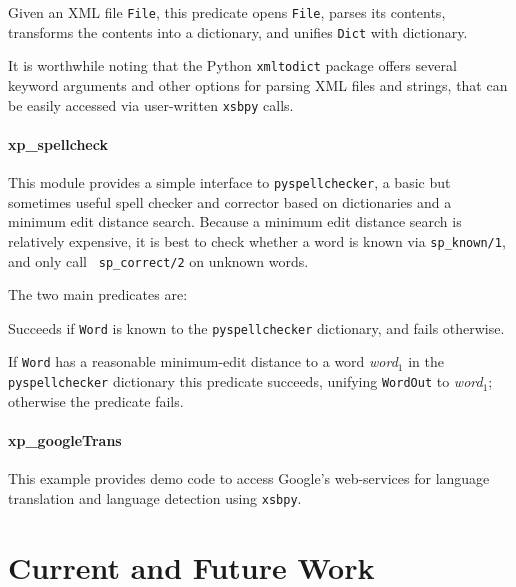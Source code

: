 \begin{description}
  
  Given an XML file {\tt File}, this predicate opens {\tt File},
  parses its contents, transforms the contents into a dictionary, and
  unifies {\tt Dict} with dictionary.  
\end{description}

\noindent
It is worthwhile noting that the Python {\tt xmltodict} package offers
several keyword arguments and other options for parsing XML files and
strings, that can be easily accessed via user-written {\tt xsbpy}
calls.

\paragraph{xp\_spellcheck}
This module provides a simple interface to {\tt pyspellchecker}, a
basic but sometimes useful spell checker and corrector based on
dictionaries and a minimum edit distance search.  Because a minimum
edit distance search is relatively expensive, it is best to check
whether a word is known via {\tt sp\_known/1}, and only call {\tt
  sp\_correct/2} on unknown words.

The two main predicates are:
\begin{description}
 Succeeds
  if {\tt Word} is known to the {\tt pyspellchecker} dictionary, and
  fails otherwise.

  If {\tt Word} has a reasonable minimum-edit distance to a word {\em
    word$_1$} in the {\tt pyspellchecker} dictionary this predicate
  succeeds, unifying {\tt WordOut} to {\em word$_1$}; otherwise the
  predicate fails.
\end{description}


\paragraph{xp\_googleTrans}
This example provides demo code to access Google's web-services for
language translation and language detection using {\tt xsbpy}.



\section{Current and Future Work}

